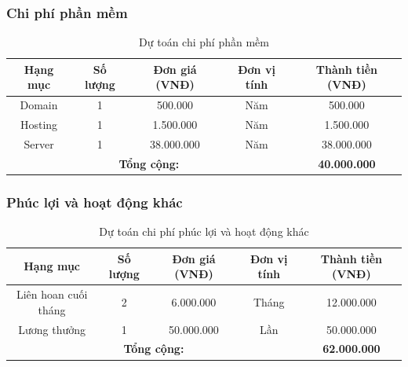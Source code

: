 \subsubsection{Chi phí phần mềm}
\begin{table}[H]
    \centering
    \renewcommand{\arraystretch}{1.5} %
    \caption{Dự toán chi phí phần mềm}
    \begin{tabular}{|c|c|c|c|c|}
        \hline
        \textbf{Hạng mục}                         & \textbf{Số lượng}   & \textbf{Đơn giá (VNĐ)} & \textbf{Đơn vị tính} & \textbf{Thành tiền (VNĐ)} \\
        \hline
        Domain                                    & 1                   & 500.000                & Năm                  & 500.000                   \\
        \hline
        Hosting                                   & 1                   & 1.500.000              & Năm                  & 1.500.000                 \\
        \hline
        Server                                    & 1                   & 38.000.000             & Năm                  & 38.000.000                \\
        \hline
        \multicolumn{4}{|c|}{\textbf{Tổng cộng:}} & \textbf{40.000.000}                                                                             \\
        \hline
    \end{tabular}
\end{table}


\subsubsection{Phúc lợi và hoạt động khác}
\begin{table}[H]
    \centering
    \renewcommand{\arraystretch}{1.5} %
    \caption{Dự toán chi phí phúc lợi và hoạt động khác}
    \begin{tabular}{|c|c|c|c|c|}
        \hline
        \textbf{Hạng mục}                         & \textbf{Số lượng}   & \textbf{Đơn giá (VNĐ)} & \textbf{Đơn vị tính} & \textbf{Thành tiền (VNĐ)} \\
        \hline
        Liên hoan cuối tháng                      & 2                   & 6.000.000              & Tháng                & 12.000.000                \\
        \hline
        Lương thưởng                              & 1                   & 50.000.000             & Lần                  & 50.000.000                \\
        \hline
        \multicolumn{4}{|c|}{\textbf{Tổng cộng:}} & \textbf{62.000.000}                                                                             \\
        \hline
    \end{tabular}
\end{table}

